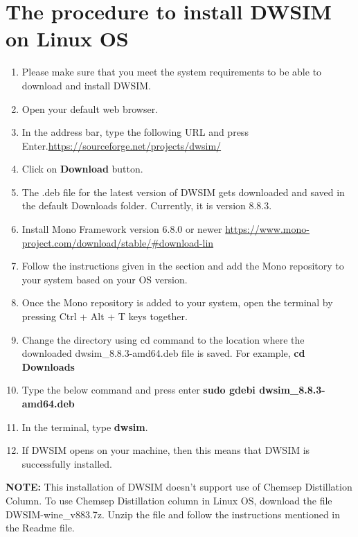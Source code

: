 \documentclass[a4paper,12pt]{article}
\begin{document}
\section{The procedure to install DWSIM on Linux OS}

\begin{enumerate}
\item Please make sure that you meet the system requirements to be able to download and install DWSIM.
\item Open your default web browser.
\item In the address bar, type the following URL and press Enter.\newline \url{https://sourceforge.net/projects/dwsim/}
\item Click on \textbf{Download} button.
\item The .deb file for the latest version of DWSIM gets downloaded and saved in the default Downloads folder. Currently, it is version 8.8.3.
\item Install Mono Framework version 6.8.0 or newer
\newline \url{https://www.mono-project.com/download/stable/#download-lin}
\item Follow the instructions given in the section and add the Mono repository to your system based on your OS version. 
\item Once the Mono repository is added to your system, open the terminal by pressing Ctrl + Alt + T keys together.
\item Change the directory using cd command to the location where the downloaded dwsim\_8.8.3-amd64.deb file is saved. For example, \textbf{cd Downloads}
\item Type the below command and press enter
\newline \textbf{sudo gdebi dwsim\_8.8.3-amd64.deb}
\item In the terminal, type \textbf{dwsim}.
\item If DWSIM opens on your machine, then this means that DWSIM is successfully installed.

\end{enumerate}

\noindent \textbf{NOTE:} This installation of DWSIM doesn't support use of Chemsep Distillation Column. To use Chemsep Distillation column in Linux OS, download the file DWSIM-wine\_v883.7z. Unzip the file and follow the instructions mentioned in the Readme file.
\end{document}
